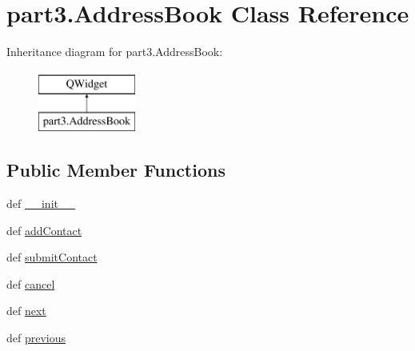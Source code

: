 \hypertarget{classpart3_1_1AddressBook}{}\section{part3.\+Address\+Book Class Reference}
\label{classpart3_1_1AddressBook}
Inheritance diagram for part3.\+Address\+Book\+:\begin{figure}[H]
\begin{center}
\leavevmode
\includegraphics[height=2.000000cm]{classpart3_1_1AddressBook}
\end{center}
\end{figure}
\subsection*{Public Member Functions}
\begin{DoxyCompactItemize}
\item 
def \hyperlink{classpart3_1_1AddressBook_a93604720d280f7f52bf5d24d450c5213}{\+\_\+\+\_\+init\+\_\+\+\_\+}
\item 
def \hyperlink{classpart3_1_1AddressBook_a13b930d4c0b7c3c2f65108904a9c4ee9}{add\+Contact}
\item 
def \hyperlink{classpart3_1_1AddressBook_ae163be2fed7d116fd75536fb6d1992b1}{submit\+Contact}
\item 
def \hyperlink{classpart3_1_1AddressBook_ae92bbb56e2afcab3578ea4d103dffe96}{cancel}
\item 
def \hyperlink{classpart3_1_1AddressBook_aa51c17c1e37d6f4adf01be7639ead92b}{next}
\item 
def \hyperlink{classpart3_1_1AddressBook_aca32dd92ebc2735bccac0834ac165c86}{previous}
\end{DoxyCompactItemize}
